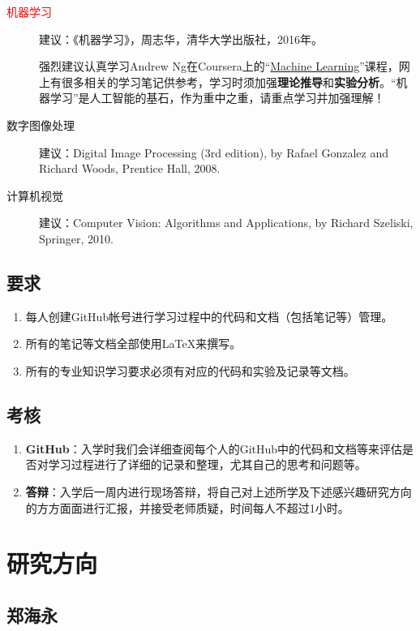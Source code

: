 \documentclass[14pt,a4paper]{extarticle}
\begin{document}
\begin{description}
\item[\textcolor{red}{机器学习}] 建议：《机器学习》，周志华，清华大学出版社，2016年。

强烈建议认真学习Andrew Ng在Coursera上的“\href{https://www.coursera.org/learn/machine-learning}{Machine Learning}”课程，网上有很多相关的学习笔记供参考，学习时须加强\textbf{理论推导}和\textbf{实验分析}。“机器学习”是人工智能的基石，作为重中之重，请重点学习并加强理解！
\item[数字图像处理] 建议：Digital Image Processing (3rd edition), by Rafael Gonzalez and Richard Woods, Prentice Hall, 2008.
\item[计算机视觉] 建议：Computer Vision: Algorithms and Applications, by Richard Szeliski, Springer, 2010.
\end{description}

\subsection{要求}

\begin{enumerate}
\item 每人创建GitHub帐号进行学习过程中的代码和文档（包括笔记等）管理。
\item 所有的笔记等文档全部使用\LaTeX{}来撰写。
\item 所有的专业知识学习要求必须有对应的代码和实验及记录等文档。
\end{enumerate}

\subsection{考核}

\begin{enumerate}
\item \textbf{GitHub}：入学时我们会详细查阅每个人的GitHub中的代码和文档等来评估是否对学习过程进行了详细的记录和整理，尤其自己的思考和问题等。
\item \textbf{答辩}：入学后一周内进行现场答辩，将自己对上述所学及下述感兴趣研究方向的方方面面进行汇报，并接受老师质疑，时间每人不超过1小时。
\end{enumerate}

\section{研究方向}

\subsection{郑海永}
\end{document}
